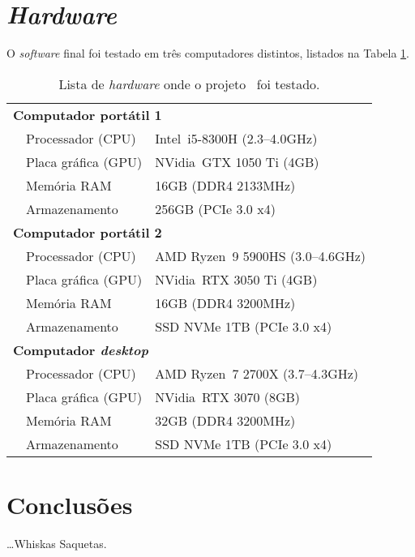 \section{\textit{Hardware}}
\label{sec::tecno:hw}

O \textit{software} final foi testado em três computadores distintos, listados na Tabela \ref{tab::hardware}.

\begin{table}[!p]
	\centering
	\caption[Lista de \textit{hardware} para testes]{Lista de \textit{hardware} onde o projeto \theapp~foi testado.}
	\label{tab::hardware}
	\begin{tabular}{p{1cm} l l}
		\toprule
		\multicolumn{3}{l}{\bfseries Computador portátil 1} \\
		& Processador (\acs{CPU})   & Intel\registered~i5-8300H (2.3--4.0GHz) \\
		& Placa gráfica (\acs{GPU}) & NVidia\registered~GTX 1050 Ti (4GB) \\
		& Memória \acs{RAM}         & 16GB (DDR4 2133MHz) \\
		& Armazenamento             & 256GB (PCIe 3.0 x4) \\
		\midrule
		\multicolumn{3}{l}{\bfseries Computador portátil 2} \\
		& Processador (\acs{CPU})   & AMD Ryzen\texttrademark~9 5900HS (3.0--4.6GHz) \\
		& Placa gráfica (\acs{GPU}) & NVidia\registered~RTX 3050 Ti (4GB) \\
		& Memória \acs{RAM}         & 16GB (DDR4 3200MHz) \\
		& Armazenamento             & SSD NVMe 1TB (PCIe 3.0 x4) \\
		\midrule
		\multicolumn{3}{l}{\bfseries Computador \textit{desktop}} \\
		& Processador (\acs{CPU})   & AMD Ryzen\texttrademark~7 2700X (3.7--4.3GHz) \\
		& Placa gráfica (\acs{GPU}) & NVidia\registered~RTX 3070 (8GB) \\
		& Memória \acs{RAM}         & 32GB (DDR4 3200MHz) \\
		& Armazenamento             & SSD NVMe 1TB (PCIe 3.0 x4) \\
		\bottomrule
	\end{tabular}
\end{table}


\section{Conclusões}
\label{sec::tecno:conc}

\ldots Whiskas Saquetas.
